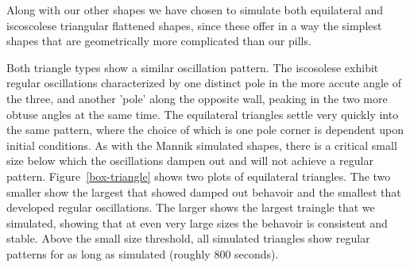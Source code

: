 \documentclass[letterpaper,twocolumn,amsmath,amssymb,pre]{revtex4-1}
\begin{document}
Along with our other shapes we have chosen to simulate both
equilateral and iscoscolese triangular flattened shapes, since these
offer in a way the simplest shapes that are geometrically more
complicated than our pills.

Both triangle types show a similar oscillation pattern.  The
iscosolese exhibit regular oscillations characterized by one distinct
pole in the more accute angle of the three, and another 'pole' along
the opposite wall, peaking in the two more obtuse angles at the same
time.  The equilateral triangles settle very quickly into the same
pattern, where the choice of which is one pole corner is dependent
upon initial conditions.  As with the Mannik simulated shapes, there
is a critical small size below which the oscillations dampen out and
will not achieve a regular pattern.  Figure~\ref{box-triangle} shows
two plots of equilateral triangles.  The two smaller show the
largest that showed damped out behavoir and the smallest that
developed regular oscillations.  The larger shows the largest traingle
that we simulated, showing that at even very large sizes the behavoir
is consistent and stable.  Above the small size threshold, all
simulated triangles show regular patterns for as long as simulated
(roughly 800 seconds).


\end{document}
